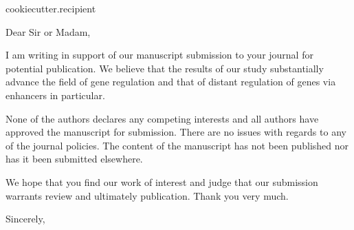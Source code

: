 \documentclass[a4paper]{scrlttr2}
\begin{document}
\begin{letter}{
  {{cookiecutter.recipient}}
}

\opening{Dear Sir or Madam,}

\thispagestyle{firststyle}

I am writing in support of our manuscript submission to your journal
for potential publication. We believe that the results of our study
substantially advance the field of gene regulation and that of distant
regulation of genes via enhancers in particular. 

None of the authors declares any competing interests and all authors have
approved the manuscript for submission. 
There are no issues with regards to any of the journal policies.
The content of the manuscript has not been published nor has it been submitted elsewhere.

We hope that you find our work of interest and judge that our submission
warrants review and ultimately publication. 
Thank you very much.

\lipsum

\bigskip
\bigskip
\closing{Sincerely,}

\end{letter}

\end{document}
